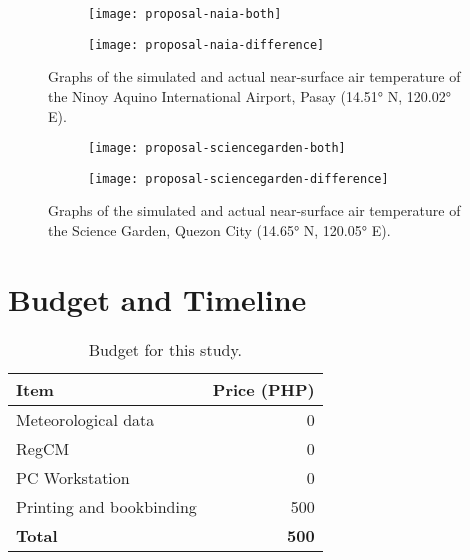 	\begin{figure}
		\centering
		\begin{subfigure}{\textwidth}
			\texttt{[image: proposal-naia-both]}
		\end{subfigure}
		\begin{subfigure}{\textwidth}
			\texttt{[image: proposal-naia-difference]}
		\end{subfigure}
		\caption{
			Graphs of the simulated and actual near-surface air temperature of the Ninoy Aquino International Airport, Pasay (\ang{14.51} N, \ang{120.02} E).
		}
		\label{fig:proposal-naia-results}
	\end{figure}

	\begin{figure}
		\centering
		\begin{subfigure}{\textwidth}
			\texttt{[image: proposal-sciencegarden-both]}
		\end{subfigure}
		\begin{subfigure}{\textwidth}
			\texttt{[image: proposal-sciencegarden-difference]}
		\end{subfigure}
		\caption{
			Graphs of the simulated and actual near-surface air temperature of the Science Garden, Quezon City (\ang{14.65} N, \ang{120.05} E).
		}
		\label{fig:proposal-sciencegarden-results}
	\end{figure}

\section{Budget and Timeline}

	\begin{table}
		\caption{Budget for this study.}
		\label{tab:budget}
		\centering
		\begin{tabular}{l r}
			\hline \hline
			Item & Price (PHP) \\
			\hline
			Meteorological data	& 0 \\
			RegCM & 0 \\
			PC Workstation & 0 \\
			Printing and bookbinding & 500 \\
			\hline
			\textbf{Total} & \textbf{500} \\
			\hline
		\end{tabular}
	\end{table}
